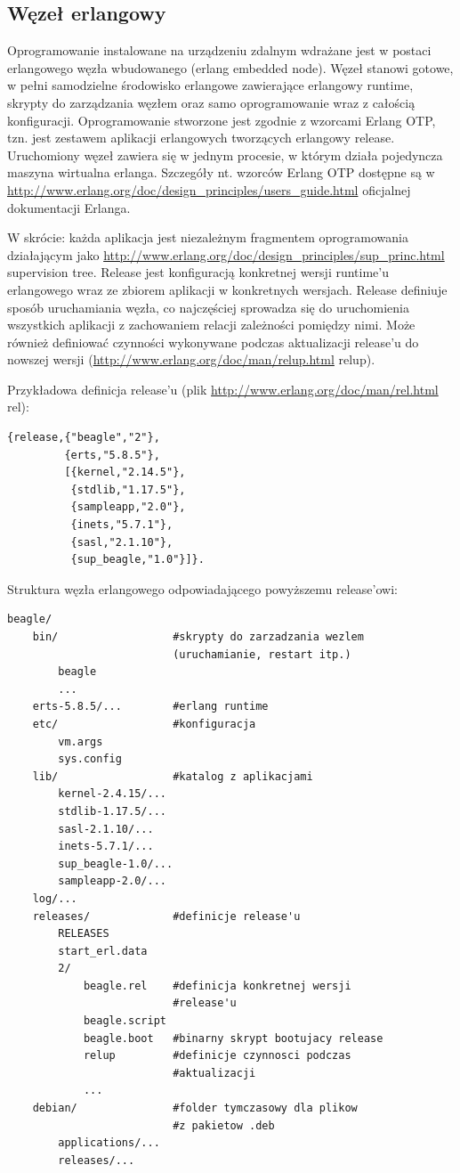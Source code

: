 \documentclass[polish,12pt]{aghthesis}
\begin{document}
\subsection{Węzeł erlangowy}
Oprogramowanie instalowane na urządzeniu zdalnym wdrażane jest w postaci erlangowego węzła wbudowanego (erlang embedded node). Węzeł stanowi gotowe, w pełni samodzielne środowisko erlangowe zawierające erlangowy runtime, skrypty do zarządzania węzłem oraz samo oprogramowanie wraz z całością konfiguracji. Oprogramowanie stworzone jest zgodnie z wzorcami Erlang OTP, tzn. jest zestawem aplikacji erlangowych tworzących erlangowy release. Uruchomiony węzeł zawiera się w jednym procesie, w którym działa pojedyncza maszyna wirtualna erlanga. Szczegóły nt. wzorców Erlang OTP dostępne są w  \url{http://www.erlang.org/doc/design_principles/users_guide.html} oficjalnej dokumentacji Erlanga.

W skrócie: każda aplikacja jest niezależnym fragmentem oprogramowania działającym jako \url{http://www.erlang.org/doc/design_principles/sup_princ.html} supervision tree. Release jest konfiguracją konkretnej wersji runtime'u erlangowego wraz ze zbiorem aplikacji w konkretnych wersjach. Release definiuje sposób uruchamiania węzła, co najczęściej sprowadza się do uruchomienia wszystkich aplikacji z zachowaniem relacji zależności pomiędzy nimi. Może również definiować czynności wykonywane podczas aktualizacji release'u do nowszej wersji (\url{http://www.erlang.org/doc/man/relup.html} relup).

Przykładowa definicja release'u (plik \url{http://www.erlang.org/doc/man/rel.html} rel):

\begin{verbatim}
{release,{"beagle","2"},
         {erts,"5.8.5"},
         [{kernel,"2.14.5"},
          {stdlib,"1.17.5"},
          {sampleapp,"2.0"},
          {inets,"5.7.1"},
          {sasl,"2.1.10"},
          {sup_beagle,"1.0"}]}.
\end{verbatim}

Struktura węzła erlangowego odpowiadającego powyższemu release'owi:

\begin{verbatim}
beagle/
    bin/                  #skrypty do zarzadzania wezlem
                          (uruchamianie, restart itp.)
        beagle
        ...
    erts-5.8.5/...        #erlang runtime
    etc/                  #konfiguracja
        vm.args
        sys.config
    lib/                  #katalog z aplikacjami
        kernel-2.4.15/...
        stdlib-1.17.5/...
        sasl-2.1.10/...
        inets-5.7.1/...
        sup_beagle-1.0/...
        sampleapp-2.0/...
    log/...
    releases/             #definicje release'u
        RELEASES
        start_erl.data
        2/
            beagle.rel    #definicja konkretnej wersji
                          #release'u
            beagle.script
            beagle.boot   #binarny skrypt bootujacy release
            relup         #definicje czynnosci podczas
                          #aktualizacji
            ...
    debian/               #folder tymczasowy dla plikow
                          #z pakietow .deb
        applications/...
        releases/...
\end{verbatim}
\end{document}
